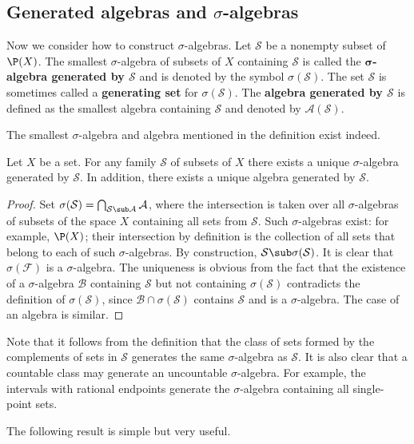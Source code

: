 \subsection{Generated algebras and \boldmath$\sigma$-algebras}
Now we consider how to construct $\sigma$-algebras. Let $\mathcal{S}$ be a nonempty subset of $\P(X)$. The smallest $\sigma$-algebra of subsets of $X$ containing $\mathcal{S}$ is called the \textbf{$\bm{\sigma}$-algebra generated by $\mathcal{S}$} and is denoted by the symbol $\sigma(\mathcal{S})$. The set $\mathcal{S}$ is sometimes called a \textbf{generating set} for $\sigma(\mathcal{S})$. The \textbf{algebra generated by $\mathcal{S}$} is defined as the smallest algebra containing $\mathcal{S}$ and denoted by $\mathcal{A}(\mathcal{S})$.\par
The smallest $\sigma$-algebra and algebra mentioned in the definition exist indeed.
\begin{proposition}
Let $X$ be a set. For any family $\mathcal{S}$ of subsets of $X$ there exists a unique $\sigma$-algebra generated by $\mathcal{S}$. In addition, there exists a unique 
algebra generated by $\mathcal{S}$.
\end{proposition}
\begin{proof}
Set $\sigma(\mathcal{S})=\bigcap_{\mathcal{S}\sub\mathcal{A}}\mathcal{A}$, where the intersection is taken over all $\sigma$-algebras of subsets of the space $X$ containing all sets from $\mathcal{S}$. Such $\sigma$-algebras exist: for example, $\P(X)$; their intersection by definition is the collection of all sets that belong to each of such $\sigma$-algebras. By construction, $\mathcal{S}\sub\sigma(\mathcal{S})$. It is clear that $\sigma(\mathcal{F})$ is a $\sigma$-algebra. The uniqueness is obvious from the fact that the existence of a $\sigma$-algebra $\mathcal{B}$ containing $\mathcal{S}$ but not containing $\sigma(\mathcal{S})$ contradicts the definition of $\sigma(\mathcal{S})$, since $\mathcal{B}\cap\sigma(\mathcal{S})$ contains $\mathcal{S}$ and is a $\sigma$-algebra. The case of an algebra is similar.
\end{proof}
Note that it follows from the definition that the class of sets formed by the complements of sets in $\mathcal{S}$ generates the same $\sigma$-algebra as $\mathcal{S}$. It is also clear that a countable class may generate an uncountable $\sigma$-algebra. For example, the intervals with rational endpoints generate the $\sigma$-algebra containing all single-point sets.\par
The following result is simple but very useful.
